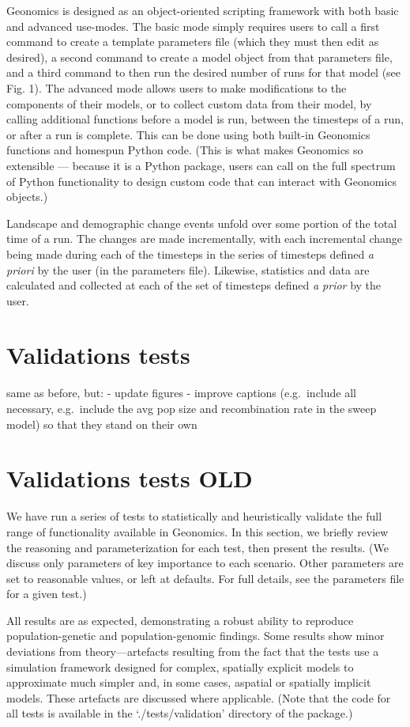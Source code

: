 ﻿\documentclass{article}
\begin{document}
Geonomics is designed as an object-oriented scripting framework with both basic and advanced use-modes.
The basic mode simply requires users to call a first command to create a template
parameters file (which they must then edit as desired), a second command to create
a model object from that parameters file, and a third command to then run the desired number
of runs for that model (see Fig. 1).
The advanced mode allows users to make modifications to the components of their models,
or to collect custom data from their model, by calling additional functions
before a model is run, between the timesteps of a run, or after a run is complete.
This can be done using both built-in Geonomics functions and homespun Python code.
(This is what makes Geonomics so extensible --- because it is a Python package, users can call on
the full spectrum of Python functionality to design custom code that can interact with Geonomics objects.)

Landscape and demographic change events unfold over some portion of the total time of a run.
The changes are made incrementally, with each incremental change being made 
during each of the timesteps in the series of timesteps defined \emph{a priori} by the user (in the parameters file).
Likewise, statistics and data are calculated and collected at each of the set of timesteps
defined \emph{a prior} by the user.


\section{Validations tests}
same as before, but:
- update figures
- improve captions (e.g.\ include all necessary, e.g.\ include the avg pop size
  and recombination rate in the sweep model) so that they stand on their own

\section{Validations tests OLD}
We have run a series of tests to statistically and heuristically validate
the full range of functionality available in Geonomics.
In this section, we briefly review the reasoning and parameterization for each test,
then present the results.
(We discuss only parameters of key importance to each scenario.
Other parameters are set to reasonable values, or left at defaults.
For full details, see the parameters file for a given test.)

All results are as expected, demonstrating a robust ability to reproduce 
population-genetic and population-genomic findings.
Some results show minor deviations from theory---artefacts resulting from the fact
that the tests use a simulation framework designed for complex, spatially explicit models 
to approximate much simpler and, in some cases, aspatial or spatially implicit models.
These artefacts are discussed where applicable.
(Note that the code for all tests is available in the `./tests/validation' directory of the package.)
\end{document}
